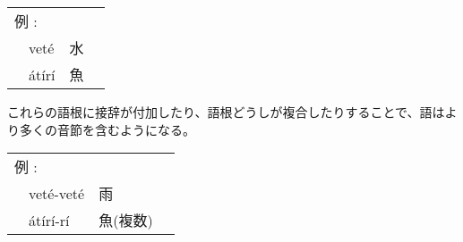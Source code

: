 \begin{tabular}{llll}
    \multicolumn{2}{l}{例 : } \\ 
    & vet\'e & 水 \\
    & \'at\'ir\'i & 魚 \\
\end{tabular}

これらの語根に接辞が付加したり、語根どうしが複合したりすることで、語はより多くの音節を含むようになる。

\begin{tabular}{llll}
    \multicolumn{2}{l}{例 : } \\ 
    & vet\'e-vet\'e & 雨 \\
    & \'at\'ir\'i-r\'i & 魚(複数) \\
\end{tabular}
